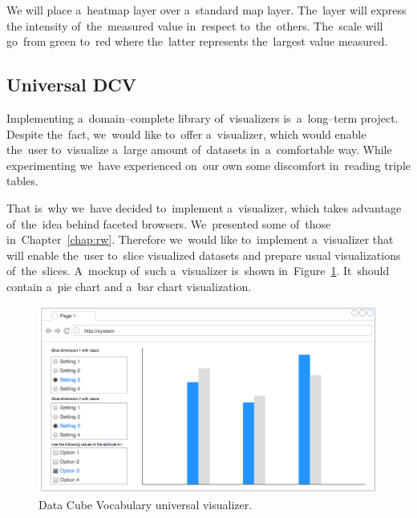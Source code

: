 We will place a~heatmap layer over a~standard map layer. The~layer will express 
the intensity of~the~measured value in~respect to~the~others. The~scale will go~from 
green to~red where the~latter represents the~largest value measured.

\subsection{Universal DCV}
Implementing a~domain--complete library of~visualizers is~a~long--term project. 
Despite the~fact, we~would like to~offer a~visualizer, which would enable the~user to~visualize a~large amount of~datasets in~a~comfortable way. While
experimenting we~have experienced on~our own some discomfort in~reading triple tables.

That is~why we~have decided to~implement a~visualizer, which takes advantage of~the~idea behind faceted browsers. We~presented some of~those in~Chapter~\ref{chap:rw}. Therefore we~would like to~implement a~visualizer that will 
enable the~user to~slice visualized datasets and prepare usual visualizations of~the~slices. A~mockup of~such a~visualizer is~shown in~Figure~\ref{fig:dcv-universal}. It~should contain a~pie chart and a~bar chart 
visualization.

\begin{figure}
	\centering
	\includegraphics[width=140mm]{img/dcv-universal.png}
	\caption{Data Cube Vocabulary universal visualizer.}
	\label{fig:dcv-universal}
\end{figure}



